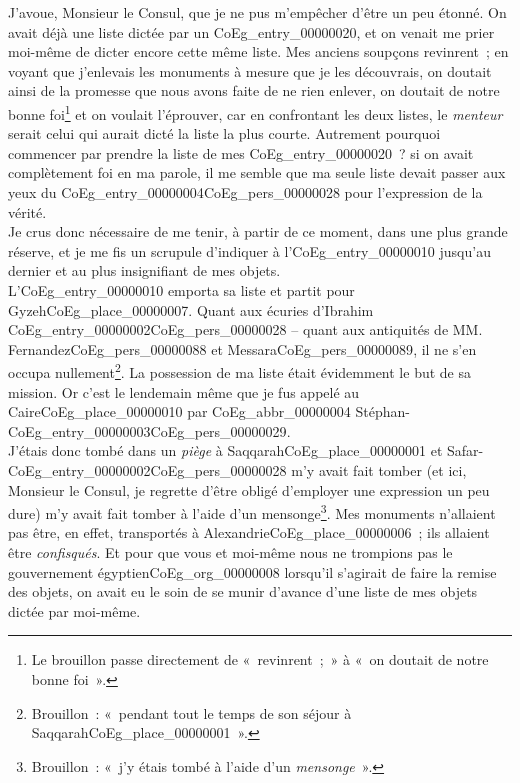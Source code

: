 \documentclass{book}
\begin{document}
\indent J’avoue, Monsieur le Consul, que je ne pus m’empêcher d’être un peu étonné. On avait déjà une liste dictée par un \gls{CoEg_entry_00000020}, et on venait me prier moi-même de dicter encore cette même liste. Mes anciens soupçons revinrent~; en voyant que j’enlevais les monuments à mesure que je les découvrais, on doutait ainsi de la promesse que nous avons faite de ne rien enlever, on doutait de notre bonne foi\footnote{Le brouillon passe directement de «~revinrent~;~» à «~on doutait de notre bonne foi~».} et on voulait l’éprouver, car en confrontant les deux listes, le \textit{menteur} serait celui qui aurait dicté la liste la plus courte. Autrement pourquoi commencer par prendre la liste de mes \gls{CoEg_entry_00000020}~? si on avait complètement foi en ma parole, il me semble que ma seule liste devait passer aux yeux du \Gls{CoEg_entry_00000004}\gls{CoEg_pers_00000028} pour l’expression de la vérité.\\
\indent Je crus donc nécessaire de me tenir, à partir de ce moment, dans une plus grande réserve, et je me fis un scrupule d’indiquer à l’\Gls{CoEg_entry_00000010} jusqu’au dernier et au plus insignifiant de mes objets.\\
\indent L’\Gls{CoEg_entry_00000010} emporta sa liste et partit pour Gyzeh\gls{CoEg_place_00000007}. Quant aux écuries d’Ibrahim \Gls{CoEg_entry_00000002}\gls{CoEg_pers_00000028} – quant aux antiquités de MM. Fernandez\gls{CoEg_pers_00000088} et Messara\gls{CoEg_pers_00000089}, il ne s’en occupa nullement\footnote{Brouillon~: «~pendant tout le temps de son séjour à Saqqarah\gls{CoEg_place_00000001}~».}. La possession de ma liste était évidemment le but de sa mission. Or c’est le lendemain même que je fus appelé au Caire\gls{CoEg_place_00000010} par \gls{CoEg_abbr_00000004} Stéphan-\Gls{CoEg_entry_00000003}\gls{CoEg_pers_00000029}.\\
\indent J’étais donc tombé dans un \textit{piège} à Saqqarah\gls{CoEg_place_00000001} et Safar-\Gls{CoEg_entry_00000002}\gls{CoEg_pers_00000028} m’y avait fait tomber (et ici, Monsieur le Consul, je regrette d’être obligé d’employer une expression un peu dure) m’y avait fait tomber à l’aide d’un mensonge\footnote{Brouillon~: «~j’y étais tombé à l’aide d’un \textit{mensonge}~».}. Mes monuments n’allaient pas être, en effet, transportés à Alexandrie\gls{CoEg_place_00000006}~; ils allaient être \textit{confisqués}. Et pour que vous et moi-même nous ne trompions pas le gouvernement égyptien\gls{CoEg_org_00000008} lorsqu’il s’agirait de faire la remise des objets, on avait eu le soin de se munir d’avance d’une liste de mes objets dictée par moi-même.\\
\end{document}
